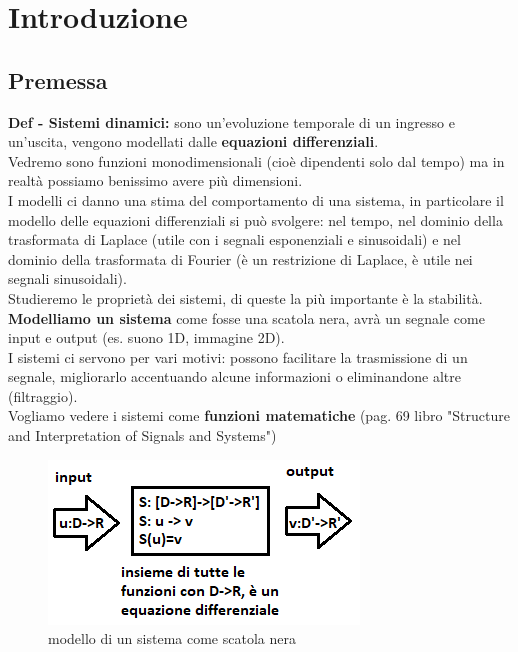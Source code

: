 \chapter{Introduzione}
\section{ Premessa }

\textbf{Def - Sistemi dinamici:}  sono un'evoluzione temporale di un ingresso e un'uscita, vengono modellati dalle \textbf{equazioni differenziali}.\\
Vedremo sono funzioni monodimensionali (cioè dipendenti solo dal tempo) ma in realtà possiamo benissimo avere più dimensioni.\\
I modelli ci danno una stima del comportamento di una sistema, in particolare il modello delle equazioni differenziali si può svolgere: nel tempo, nel dominio della trasformata di Laplace (utile con i segnali esponenziali e sinusoidali) e nel dominio della trasformata di Fourier (è un restrizione di Laplace, è utile nei segnali sinusoidali).\\
Studieremo le proprietà dei sistemi, di queste la più importante è la stabilità.\\
\textbf{Modelliamo un sistema} come fosse una scatola nera, avrà un segnale come input e output (es. suono 1D, immagine 2D).\\
I sistemi ci servono per vari motivi: possono facilitare la trasmissione di un segnale, migliorarlo accentuando alcune informazioni o eliminandone altre (filtraggio).\\
Vogliamo vedere i sistemi come \textbf{funzioni matematiche} (pag. 69 libro "Structure and Interpretation of Signals and Systems")\\

\begin{figure}
	\centering
	\includegraphics[width=0.7\linewidth]{immagini/sistema}
	\caption{ modello di un sistema come scatola nera}
	\label{fig:sistema}
\end{figure}



